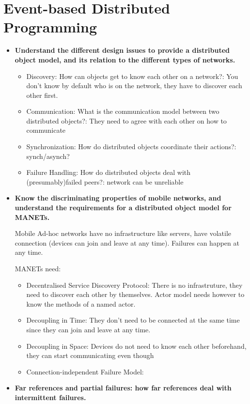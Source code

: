 \documentclass[a4paper]{report}
\begin{document}
\chapter{Event-based Distributed Programming}
\begin{itemize}
  \item \textbf{Understand the different design issues to provide a distributed object model, and its relation to the different types of networks.}
  \begin{itemize}
    \item Discovery: How can objects get to know each other on a network?: You don't know by default who is on the network, they have to discover each other first.
    \item Communication: What is the communication model between two distributed objects?: They need to agree with each other on how to communicate
    \item Synchronization: How do distributed objects coordinate their actions?: synch/asynch?
    \item Failure Handling: How do distributed objects deal with (presumably)failed peers?: network can be unreliable
  \end{itemize}
  \item \textbf{Know the discriminating properties of mobile networks, and understand the requirements for a distributed object model for MANETs.}

  Mobile Ad-hoc networks have no infrastructure like servers, have volatile connection (devices can join and leave at any time). Failures can happen at any time.

  MANETs need:
  \begin{itemize}
    \item Decentralised Service Discovery Protocol: There is no infrastruture, they need to discover each other by themselves. Actor model needs however to know the methods of a named actor.
    \item Decoupling in Time: They don't need to be connected at the same time since they can join and leave at any time. 
    \item Decoupling in Space: Devices do not need to know each other beforehand, they can start communicating even though 
    \item Connection-independent Failure Model: 
  \end{itemize}
  \item \textbf{Far references and partial failures: how far references deal with intermittent failures.}


\end{itemize}
\end{document}
